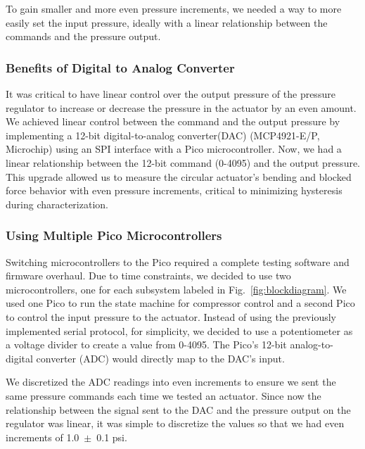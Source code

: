To gain smaller and more even pressure increments, we needed a way to more easily set the input pressure, ideally with a linear relationship between the commands and the pressure output. 

\subsubsection{Benefits of Digital to Analog Converter}

It was critical to have linear control over the output pressure of the pressure regulator to increase or decrease the pressure in the actuator by an even amount. We achieved linear control between the command and the output pressure by implementing a 12-bit digital-to-analog converter(DAC) (MCP4921-E/P, Microchip) using an SPI interface with a Pico microcontroller. Now, we had a linear relationship between the 12-bit command (0-4095) and the output pressure. This upgrade allowed us to measure the circular actuator's bending and blocked force behavior with even pressure increments, critical to minimizing hysteresis during characterization. 

\subsubsection{Using Multiple Pico Microcontrollers}

Switching microcontrollers to the Pico required a complete testing software and firmware overhaul. Due to time constraints, we decided to use two microcontrollers, one for each subsystem labeled in Fig.~\ref{fig:blockdiagram}. We used one Pico to run the state machine for compressor control and a second Pico to control the input pressure to the actuator. Instead of using the previously implemented serial protocol, for simplicity, we decided to use a potentiometer as a voltage divider to create a value from 0-4095. The Pico's 12-bit analog-to-digital converter (ADC) would directly map to the DAC's input. 

We discretized the ADC readings into even increments to ensure we sent the same pressure commands each time we tested an actuator. Since now the relationship between the signal sent to the DAC and the pressure output on the regulator was linear, it was simple to discretize the values so that we had even increments of 1.0~$\pm$~0.1 psi. 

